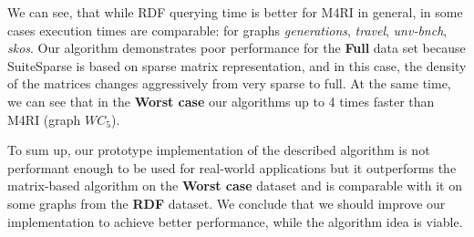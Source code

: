We can see, that while RDF querying time is better for M4RI in general, in some cases execution times are comparable: for graphs \textit{generations}, \textit{travel},  \textit{unv-bnch}, \textit{skos}.
Our algorithm demonstrates poor performance for the \textbf{Full} data set because SuiteSparse is based on sparse matrix representation, and in this case, the density of the matrices changes aggressively from very sparse to full.
At the same time, we can see that in the \textbf{Worst case} our algorithms up to 4 times faster than M4RI (graph $WC_5$).

To sum up, our prototype implementation of the described algorithm is not performant enough to be used for real-world applications but it outperforms the matrix-based algorithm on the \textbf{Worst case} dataset and is comparable with it on some graphs from the \textbf{RDF} dataset.
We conclude that we should improve our implementation to achieve better performance, while the algorithm idea is viable.

